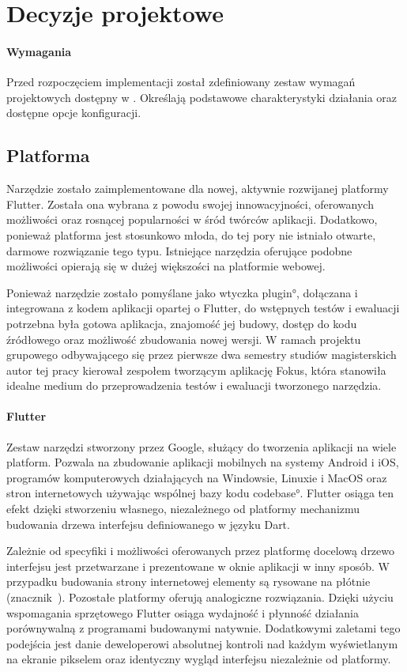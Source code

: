 \section{Decyzje projektowe}

\paragraph{Wymagania} Przed rozpoczęciem implementacji został zdefiniowany zestaw wymagań projektowych dostępny w . Określają podstawowe charakterystyki działania oraz dostępne opcje konfiguracji.

\subsection{Platforma}
Narzędzie zostało zaimplementowane dla nowej, aktywnie rozwijanej platformy Flutter. Została ona wybrana z powodu swojej innowacyjności, oferowanych możliwości oraz rosnącej popularności w śród twórców aplikacji. Dodatkowo, ponieważ platforma jest stosunkowo młoda, do tej pory nie istniało otwarte, darmowe rozwiązanie tego typu. Istniejące narzędzia oferujące podobne możliwości opierają się w dużej większości na platformie webowej.

Ponieważ narzędzie zostało pomyślane jako wtyczka \ang{plugin}, dołączana i integrowana z kodem aplikacji opartej o Flutter, do wstępnych testów i ewaluacji potrzebna była gotowa aplikacja, znajomość jej budowy, dostęp do kodu źródłowego oraz możliwość zbudowania nowej wersji. W ramach projektu grupowego odbywającego się przez pierwsze dwa semestry studiów magisterskich autor tej pracy kierował zespołem tworzącym aplikację Fokus, która stanowiła idealne medium do przeprowadzenia testów i ewaluacji tworzonego narzędzia.

\paragraph{Flutter} Zestaw narzędzi stworzony przez Google, służący do tworzenia aplikacji na wiele platform. Pozwala na zbudowanie aplikacji mobilnych na systemy Android i iOS, programów komputerowych działających na Windowsie, Linuxie i MacOS oraz stron internetowych używając wspólnej bazy kodu \ang{codebase}. Flutter osiąga ten efekt dzięki stworzeniu własnego, niezależnego od platformy mechanizmu budowania drzewa interfejsu definiowanego w języku Dart. 

Zależnie od specyfiki i możliwości oferowanych przez platformę docelową drzewo interfejsu jest przetwarzane i prezentowane w oknie aplikacji w inny sposób. W przypadku budowania strony internetowej elementy są rysowane na płótnie (znacznik~). Pozostałe platformy oferują analogiczne rozwiązania. Dzięki użyciu wspomagania sprzętowego Flutter osiąga wydajność i płynność działania porównywalną z programami budowanymi natywnie. Dodatkowymi zaletami tego podejścia jest danie deweloperowi absolutnej kontroli nad każdym wyświetlanym na ekranie pikselem oraz identyczny wygląd interfejsu niezależnie od platformy.

